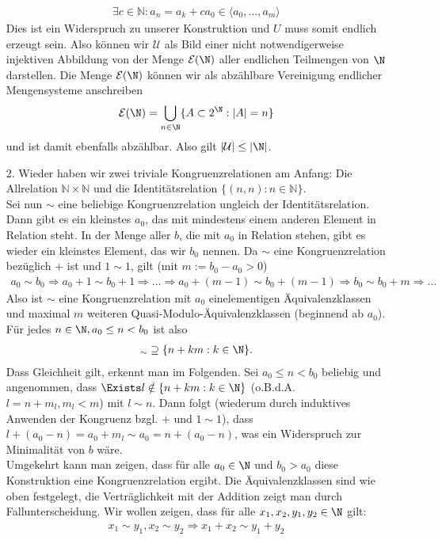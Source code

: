 \begin{solution}
\begin{itemize}
\begin{align*}
  \exists c \in \mathbb{N}: a_n = a_k + ca_0 \in \langle a_0,\dots,a_m \rangle
\end{align*}
Dies ist ein Widerspruch zu unserer Konstruktion und $U$ muss somit endlich erzeugt sein.
Also können wir $\mathcal{U}$ als Bild einer nicht notwendigerweise injektiven
Abbildung von der Menge $\mathcal{E}(\N)$ aller endlichen Teilmengen von $\N$ darstellen.
Die Menge $\mathcal{E}(\N)$ können wir als
abzählbare Vereinigung endlicher Mengensysteme anschreiben
\begin{align*}
  \mathcal{E}(\N) = \bigcup_{n \in \N} \{A \subset 2^\N: |A| = n \}
\end{align*}
und ist damit ebenfalls abzählbar. Also gilt $|\mathcal{U}| \leq |\N|$.
\item [2.] Wieder haben wir zwei triviale Kongruenzrelationen am Anfang:
Die Allrelation $\mathbb{N} \times \mathbb{N}$ und die Identitätsrelation
$\{(n,n): n \in \mathbb{N}\}$. \\

Sei nun $\sim$ eine beliebige Kongruenzrelation ungleich der Identitätsrelation.
Dann gibt es ein kleinstes $a_{0}$, das mit mindestens einem anderen Element in Relation steht. In der Menge aller $b$, die mit $a_{0}$ in
Relation stehen, gibt es wieder ein kleinstes Element, das wir $b_{0}$ nennen. Da $\sim$ eine Kongruenzrelation bezüglich $+$ ist und $1
\sim 1$, gilt (mit $m := b_{0}-a_{0} > 0$)
\begin{align*}
  a_{0} \sim b_{0} \Rightarrow a_{0}+1 \sim b_{0}+1 \Rightarrow \dots \Rightarrow a_{0}+(m-1) \sim b_{0}+(m-1) \Rightarrow b_{0} \sim
  b_{0}+m \Rightarrow \dots
\end{align*}
Also ist $\sim$ eine Kongruenzrelation mit $a_{0}$ einelementigen Äquivalenzklassen und maximal $m$ weiteren Quasi-Modulo-Äquivalenzklassen
(beginnend ab $a_{0}$).
Für jedes $n \in \N,a_0 \leq n < b_0$ ist also
\begin{align*}
  [n]_{\sim} \supseteq \{n + km: k \in \N\}.
\end{align*}
Dass Gleichheit gilt, erkennt man im Folgenden. Sei $a_0 \leq n < b_0$ beliebig und angenommen, dass $\Exists l \notin \{n + km: k \in \N\}$ (o.B.d.A. $l = n + m_l, m_l < m$) mit $l \sim n$. Dann folgt (wiederum durch induktives Anwenden der Kongruenz bzgl. $+$ und $1 \sim 1$), dass $l + (a_0 - n) = a_0 + m_l \sim a_0 = n + (a_0 - n)$, was ein Widerspruch zur Minimalität von $b$ wäre.\\
Umgekehrt kann man zeigen, dass für alle $a_0 \in \N$ und $b_0 > a_0$ diese Konstruktion eine Kongruenzrelation ergibt. Die Äquivalenzklassen sind wie oben festgelegt, die Verträglichkeit mit der Addition zeigt man durch Fallunterscheidung.
Wir wollen zeigen, dass für alle $x_1,x_2,y_1,y_2 \in \N$ gilt:
\begin{align*}
  x_1 \sim y_1,x_2 \sim y_2 \Rightarrow x_1 + x_2 \sim y_1 + y_2
\end{align*}


\end{itemize}
\end{solution}
